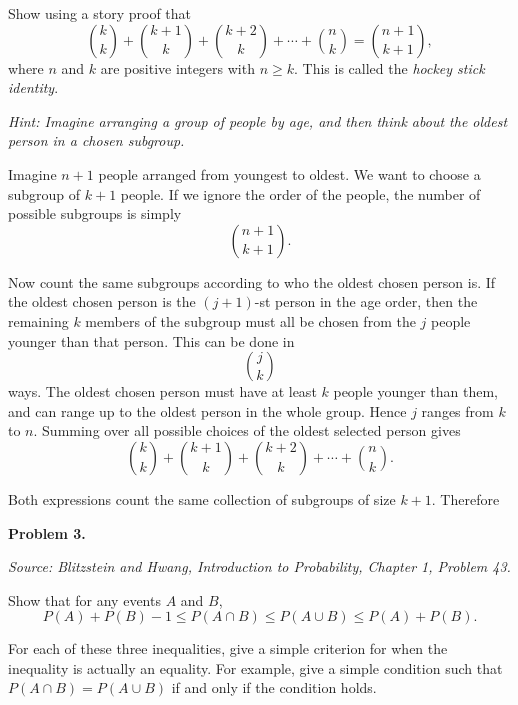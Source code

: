 \documentclass[11pt]{article}
\newcommand{\source}[1]{%
    \vspace{0.15cm}
    {\small\textit{Source: Blitzstein and Hwang, \textit{Introduction to Probability}, Chapter 1, Problem #1.}}
}
\begin{document}
Show using a story proof that
\[
{ k \choose k}
+
{ k+1 \choose k}
+
{ k+2 \choose k}
+
\cdots
+
{ n \choose k}
=
{ n+1 \choose k+1},
\]
where $n$ and $k$ are positive integers with $n\ge k$. This is called the \emph{hockey stick identity}.

\emph{Hint: Imagine arranging a group of people by age, and then think about the oldest person in a chosen subgroup.}

\begin{solutionbox}
Imagine \(n+1\) people arranged from youngest to oldest. We want to choose a subgroup of \(k+1\) people. If we ignore the order of the people, the number of possible subgroups is simply
\[
\binom{n+1}{k+1}.
\]

Now count the same subgroups according to who the oldest chosen person is. If the oldest chosen person is the \((j+1)\)-st person in the age order, then the remaining \(k\) members of the subgroup must all be chosen from the \(j\) people younger than that person. This can be done in
\[
\binom{j}{k}
\]
ways. The oldest chosen person must have at least \(k\) people younger than them, and can range up to the oldest person in the whole group. Hence \(j\) ranges from \(k\) to \(n\). Summing over all possible choices of the oldest selected person gives
\[
\binom{k}{k}
+
\binom{k+1}{k}
+
\binom{k+2}{k}
+
\cdots
+
\binom{n}{k}.
\]

Both expressions count the same collection of subgroups of size \(k+1\). Therefore

\end{solutionbox}
\newpage


\begin{problemheader}
\textbf{Problem 3.  }
\end{problemheader}
\source{43}

Show that for any events $A$ and $B$,
\[
P(A)+P(B)-1
\le
P(A\cap B)
\le
P(A\cup B)
\le
P(A)+P(B).
\]

For each of these three inequalities, give a simple criterion for when the inequality is actually an equality. For example, give a simple condition such that $P(A\cap B)=P(A\cup B)$ if and only if the condition holds.
\end{document}
